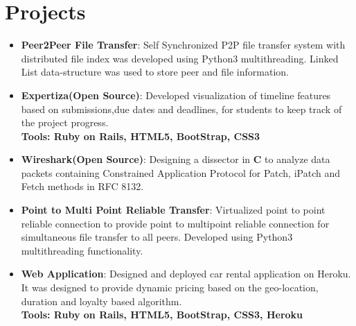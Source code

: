 \documentclass[letterpaper,11pt]{article}
\newcommand{\resumeItem}[2]{
  \item\small{
    \textbf{#1}{: #2 \vspace{-2pt}}
  }
}
\newcommand{\resumeSubItem}[2]{\resumeItem{#1}{#2}\vspace{-4pt}}
\newcommand{\resumeSubHeadingListStart}{\begin{itemize}[leftmargin=*]}
\newcommand{\resumeSubHeadingListEnd}{\end{itemize}}
\begin{document}
\section{Projects}
  \resumeSubHeadingListStart
    \resumeSubItem{Peer2Peer File Transfer}
      {Self Synchronized P2P file transfer system with distributed file index was developed using Python3 multithreading. Linked List data-structure was used to store peer and file information.}
    \resumeSubItem{Expertiza(Open Source)}
      {Developed visualization of timeline features based on submissions,due dates and deadlines, for students to keep track of the project progress.\\ \textbf{Tools: Ruby on Rails, HTML5, BootStrap, CSS3}}
    \resumeSubItem{Wireshark(Open Source)}
      {Designing a dissector in \textbf{C} to analyze data packets containing Constrained Application Protocol for Patch, iPatch and Fetch methods in RFC 8132.}
    \resumeSubItem{Point to Multi Point Reliable Transfer}
      {Virtualized point to point reliable connection to provide point to multipoint reliable connection for simultaneous file transfer to all peers. Developed using Python3 multithreading functionality.}
    \resumeSubItem{Web Application}
      {Designed and deployed car rental application on Heroku. It was designed to provide dynamic pricing based on the geo-location, duration and loyalty based algorithm.\\
      \textbf{Tools: Ruby on Rails, HTML5, BootStrap, CSS3, Heroku}}
  \resumeSubHeadingListEnd


\end{document}
